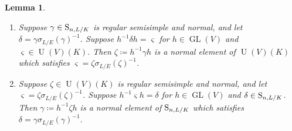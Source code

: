 \documentclass[11pt, reqno]{amsart}
\numberwithin{equation}{subsection}
\theoremstyle{plain}
\newtheorem{lem}[proposition]{Lemma}
\theoremstyle{definition}
\renewcommand{\S}{\textnormal{S}}
\DeclareMathOperator{\GL}{GL}
\DeclareMathOperator{\U}{U}
\begin{document}
\begin{lem}
\label{lem:normmatch}
\leavevmode
\begin{enumerate}[(1)]
\item Suppose $\gamma \in \S_{n,L/K}$ is regular
semisimple and normal,
and let $\delta = \gamma \sigma_{L/E}(\gamma)^{-1}$.
Suppose $h^{-1}\delta h = \varsigma$ for $h \in \GL(V)$
and $\varsigma \in \U(V)(K)$.
Then $\zeta \coloneqq h^{-1}\gamma h$ is a normal element
of $\U(V)(K)$ which satisfies $\varsigma = \zeta\sigma_{L/E}(\zeta)^{-1}$. 

\item Suppose $\zeta \in \U(V)(K)$ is regular semisimple
and normal, and
let $\varsigma = \zeta\sigma_{L/E}(\zeta)^{-1}$.
Suppose $h^{-1} \varsigma h = \delta$ for $h \in \GL(V)$
and $\delta \in \S_{n,L/K}$. 
Then $\gamma \coloneqq h^{-1}\zeta h$ is a normal element
of $\S_{n,L/K}$ which satisfies 
$\delta = \gamma\sigma_{L/E}(\gamma)^{-1}$.
\end{enumerate}
\end{lem}
\end{document}
